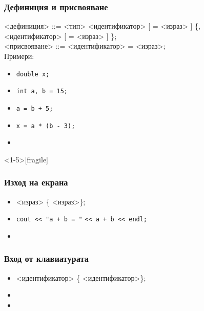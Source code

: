 \documentclass{beamer}
\begin{document}
\begin{frame}[fragile]
  \frametitle{Дефиниция и присвояване}
<дефиниция> ::= <тип>
<идентификатор> [ \tta= <израз> ] \{\tta,\\
\hspace{25ex}
<идентификатор> [ \tta= <израз> ] \}\tta;\\[2em]
<присвояване> ::= <идентификатор> \tta= <израз>\tta;\\[2em]
\pause
Примери:
\begin{itemize}
\item \lstinline{double x;}
\item \lstinline{int a, b = 15;}
\item \lstinline{a = b + 5;}
\item \lstinline{x = a * (b - 3);}
\item {}
\end{itemize}
\end{frame}

\begin{frame}<1-5>[fragile]
  \frametitle{Изход на екрана}

  \begin{itemize}
  \item {} <израз> \{\tta{<{}<} <израз>\}\tta;
  \item<4-> \lstinline{cout << "a + b = "} \lstinline{<< a + b << endl;}
  \item<5-> 
  \end{itemize}
\end{frame}

\begin{frame}
  \frametitle{Вход от клавиатурата}

  \begin{itemize}
  \item {} <идентификатор> \{\tta{>{}>} <идентификатор>\}\tta;
  \item<4-> 
  \item<5-> 
  \end{itemize}
\end{frame}
\end{document}
